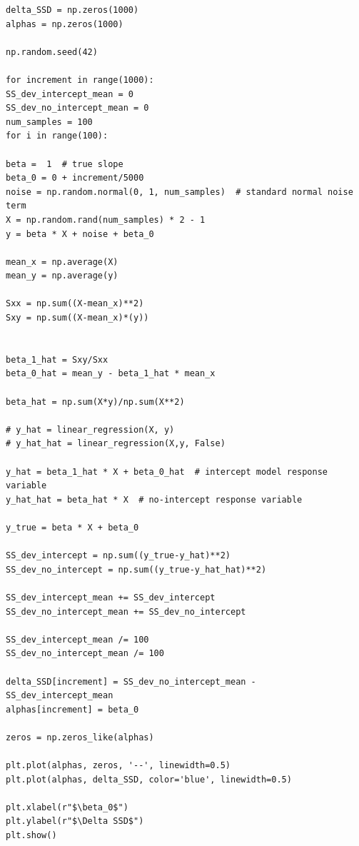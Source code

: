 \documentclass[12pt,a4paper,oneside]{book} %
\begin{document}
	
\begin{mdframed}[linecolor=black, topline=true, bottomline=true,
	leftline=false, rightline=false, backgroundcolor=yellow!20!white]
	\begin{verbatim}
delta_SSD = np.zeros(1000)
alphas = np.zeros(1000)

np.random.seed(42)

for increment in range(1000):
SS_dev_intercept_mean = 0
SS_dev_no_intercept_mean = 0
num_samples = 100 
for i in range(100):

beta =  1  # true slope
beta_0 = 0 + increment/5000
noise = np.random.normal(0, 1, num_samples)  # standard normal noise term
X = np.random.rand(num_samples) * 2 - 1
y = beta * X + noise + beta_0

mean_x = np.average(X)
mean_y = np.average(y)

Sxx = np.sum((X-mean_x)**2)
Sxy = np.sum((X-mean_x)*(y))


beta_1_hat = Sxy/Sxx
beta_0_hat = mean_y - beta_1_hat * mean_x

beta_hat = np.sum(X*y)/np.sum(X**2)

# y_hat = linear_regression(X, y)
# y_hat_hat = linear_regression(X,y, False)

y_hat = beta_1_hat * X + beta_0_hat  # intercept model response variable
y_hat_hat = beta_hat * X  # no-intercept response variable

y_true = beta * X + beta_0

SS_dev_intercept = np.sum((y_true-y_hat)**2)
SS_dev_no_intercept = np.sum((y_true-y_hat_hat)**2)

SS_dev_intercept_mean += SS_dev_intercept
SS_dev_no_intercept_mean += SS_dev_no_intercept

SS_dev_intercept_mean /= 100
SS_dev_no_intercept_mean /= 100

delta_SSD[increment] = SS_dev_no_intercept_mean - SS_dev_intercept_mean
alphas[increment] = beta_0

zeros = np.zeros_like(alphas)

plt.plot(alphas, zeros, '--', linewidth=0.5)
plt.plot(alphas, delta_SSD, color='blue', linewidth=0.5)

plt.xlabel(r"$\beta_0$")
plt.ylabel(r"$\Delta SSD$")
plt.show()

		\end{verbatim}
\end{mdframed}
	
	
	
	
\end{document}
